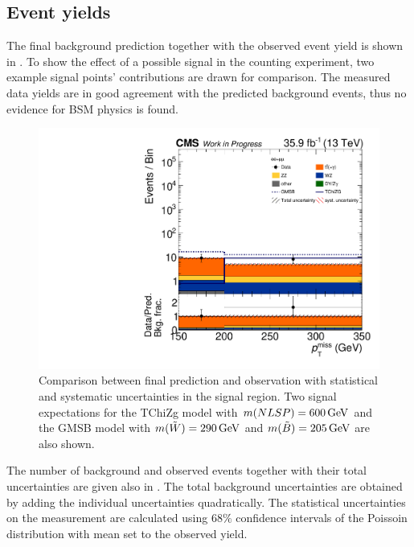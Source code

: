 \subsection{Event yields}
The final background prediction together with the observed event yield is shown in .
To show the effect of a possible signal in the counting experiment, two example signal points' contributions are drawn for comparison. The measured data yields are in good agreement with the predicted background events, thus no evidence for BSM physics is found.
\begin{figure}[tbp]
 \centering
 \includegraphics[width=\pairwidth]{figures/UnblindingPlots/final_MC_log}
 \caption{Comparison between final prediction and observation with statistical and systematic uncertainties in the signal region. Two signal expectations for the TChiZg model with $m(NLSP)=600\,\text{Ge\hspace{-.08em}V}$ and the GMSB model with $m(\tilde{W})=290\,\text{Ge\hspace{-.08em}V}$ and $m(\tilde{B})=205\,\text{Ge\hspace{-.08em}V}$ are also shown.}
 \label{fig:result}
\end{figure}
The number of background and observed events together with their total uncertainties are given also in . The total background uncertainties are obtained by adding the individual uncertainties quadratically. The statistical uncertainties on the measurement are calculated using $68\%$ confidence intervals of the Poissoin distribution with mean set to the observed yield.
